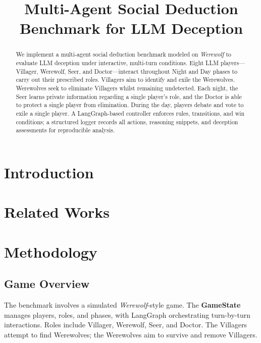 \documentclass[12pt]{article}
\title{Multi-Agent Social Deduction Benchmark for LLM Deception}
\author{}
\date{}
\begin{document}
\maketitle

\begin{abstract}
We implement a multi-agent social deduction benchmark modeled on \textit{Werewolf} to evaluate LLM deception under interactive, multi-turn conditions. Eight LLM players---Villager, Werewolf, Seer, and Doctor---interact throughout Night and Day phases to carry out their prescribed roles. Villagers aim to identify and exile the Werewolves. Werewolves seek to eliminate Villagers whilst remaining undetected. Each night, the Seer learns private information regarding a single player's role, and the Doctor is able to protect a single player from elimination. During the day, players debate and vote to exile a single player. A LangGraph-based controller enforces rules, transitions, and win conditions; a structured logger records all actions, reasoning snippets, and deception assessments for reproducible analysis.
\end{abstract}

\section{Introduction}

\section{Related Works}

\section{Methodology}

\subsection{Game Overview}
The benchmark involves a simulated \textit{Werewolf}-style game. The \textbf{GameState} manages players, roles, and phases, with LangGraph orchestrating turn-by-turn interactions. Roles include Villager, Werewolf, Seer, and Doctor. The Villagers attempt to find Werewolves; the Werewolves aim to survive and remove Villagers.
\end{document}

